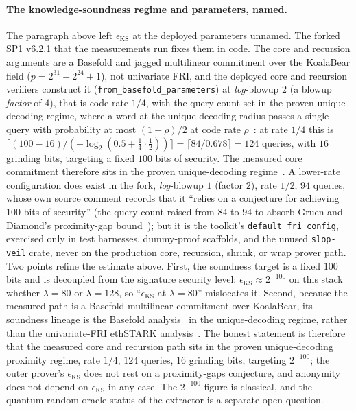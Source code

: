 \paragraph{The knowledge-soundness regime and parameters, named.}
The paragraph above left $\epsilon_{\mathrm{KS}}$ at the deployed parameters unnamed. The forked SP1 v6.2.1 that the measurements run fixes them in code. The core and recursion arguments are a Basefold and jagged multilinear commitment over the KoalaBear field ($p=2^{31}-2^{24}+1$), not univariate FRI, and the deployed core and recursion verifiers construct it (\texttt{from\_basefold\_parameters}) at \emph{log}-blowup $2$ (a blowup \emph{factor} of $4$), that is code rate $1/4$, with the query count set in the proven unique-decoding regime, where a word at the unique-decoding radius passes a single query with probability at most $(1+\rho)/2$ at code rate $\rho$~\cite{cryptoeprint:2020/654}: at rate $1/4$ this is $\lceil (100-16)/(-\log_2(0.5+\tfrac14\cdot\tfrac12))\rceil=\lceil 84/0.678\rceil=124$ queries, with $16$ grinding bits, targeting a fixed $100$ bits of security. The measured core commitment therefore sits in the proven unique-decoding regime~\cite{habock2024listdecoding}. A lower-rate configuration does exist in the fork, \emph{log}-blowup $1$ (factor $2$), rate $1/2$, $94$ queries, whose own source comment records that it ``relies on a conjecture for achieving $100$ bits of security'' (the query count raised from $84$ to $94$ to absorb Gruen and Diamond's proximity-gap bound~\cite{gruendiamond2024}); but it is the toolkit's \texttt{default\_fri\_config}, exercised only in test harnesses, dummy-proof scaffolds, and the unused \texttt{slop-veil} crate, never on the production core, recursion, shrink, or wrap prover path. Two points refine the estimate above. First, the soundness target is a fixed $100$ bits and is decoupled from the signature security level: $\epsilon_{\mathrm{KS}}\approx2^{-100}$ on this stack whether $\lambda=80$ or $\lambda=128$, so ``$\epsilon_{\mathrm{KS}}$ at $\lambda=80$'' mislocates it. Second, because the measured path is a Basefold multilinear commitment over KoalaBear, its soundness lineage is the Basefold analysis~\cite{basefold2023} in the unique-decoding regime, rather than the univariate-FRI ethSTARK analysis~\cite{ethstark}. The honest statement is therefore that the measured core and recursion path sits in the proven unique-decoding proximity regime, rate $1/4$, $124$ queries, $16$ grinding bits, targeting $2^{-100}$; the outer prover's $\epsilon_{\mathrm{KS}}$ does not rest on a proximity-gaps conjecture, and anonymity does not depend on $\epsilon_{\mathrm{KS}}$ in any case. The $2^{-100}$ figure is classical, and the quantum-random-oracle status of the extractor is a separate open question.

